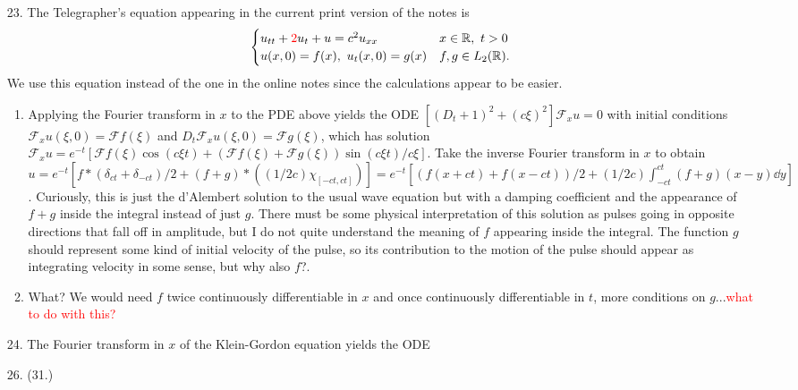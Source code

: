\documentclass[11pt,leqno]{article}
\theoremstyle{plain}
\theoremstyle{definition}
\numberwithin{equation}{section}
\numberwithin{lem}{section}
\begin{document}
\begin{enumerate}
\begin{enumerate}
    \end{enumerate}
    \item[23.] The Telegrapher's equation appearing in the current print version of the notes is
    \[\begin{cases}
      u_{tt} + \mathcolor{red}{2}u_t + u = c^2u_{xx} & x\in \mathbb R,~ t>0\\
      u(x,0) = f(x),~ u_t(x,0) = g(x) & f,g\in L_2(\mathbb R).
    \end{cases}\]
    We use this equation instead of the one in the online notes since the calculations appear to be easier. \begin{enumerate}
      \item Applying the Fourier transform in $x$ to the PDE above yields the ODE $[(D_t+1)^2+(c\xi)^2]\mathcal F_xu = 0$ with initial conditions $\mathcal F_xu(\xi,0) = \mathcal Ff(\xi)$ and $D_t\mathcal F_xu(\xi,0) = \mathcal Fg(\xi)$, which has solution $\mathcal F_xu = e^{-t}[\mathcal Ff(\xi)\cos(c\xi t) + (\mathcal Ff(\xi) +\mathcal Fg(\xi))\sin(c\xi t)/c\xi]$. Take the inverse Fourier transform in $x$ to obtain $u = e^{-t}[f\ast (\delta_{ct} + \delta_{-ct})/2 + (f+g)\ast((1/2c)\chi_{[-ct,ct]})] = e^{-t}[(f(x+ct)+f(x-ct))/2 + (1/2c)\int_{-ct}^{ct}(f+g)(x-y)\dd y]$. Curiously, this is just the d'Alembert solution to the usual wave equation but with a damping coefficient and the appearance of $f+g$ inside the integral instead of just $g$. There must be some physical interpretation of this solution as pulses going in opposite directions that fall off in amplitude, but I do not quite understand the meaning of $f$ appearing inside the integral. The function $g$ should represent some kind of initial velocity of the pulse, so its contribution to the motion of the pulse should appear as integrating velocity in some sense, but why also $f$?. 
      \item What? We would need $f$ twice continuously differentiable in $x$ and once continuously differentiable in $t$, more conditions on $g$...\textcolor{red}{what to do with this?}
    \end{enumerate}
    \item[24.] The Fourier transform in $x$ of the Klein-Gordon equation yields the ODE 
    \item[26.] (31.)
\end{enumerate}
\end{document}
